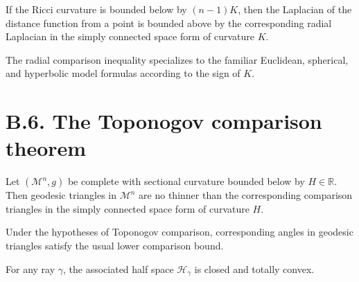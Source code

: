 \begin{theorem}
\label{appb-thm-laplacian-comparison}
If the Ricci curvature is bounded below by $(n-1)K$, then the Laplacian of the distance function from a point is bounded above by the corresponding radial Laplacian in the simply connected space form of curvature $K$.
\end{theorem}

\begin{corollary}
\label{appb-cor-model-space-radial-comparison}
The radial comparison inequality specializes to the familiar Euclidean, spherical, and hyperbolic model formulas according to the sign of $K$.
\end{corollary}

\section*{B.6. The Toponogov comparison theorem}

\begin{theorem}
\label{appb-thm-toponogov-comparison}
Let $(\mathcal M^n,g)$ be complete with sectional curvature bounded below by $H\in\mathbb R$. Then geodesic triangles in $\mathcal M^n$ are no thinner than the corresponding comparison triangles in the simply connected space form of curvature $H$.
\end{theorem}

\begin{corollary}
\label{appb-cor-angle-comparison}
Under the hypotheses of Toponogov comparison, corresponding angles in geodesic triangles satisfy the usual lower comparison bound.
\end{corollary}

\begin{lemma}
\label{appb-lem-halfspace-totally-convex}
For any ray $\gamma$, the associated half space $\mathcal H_\gamma$ is closed and totally convex.
\end{lemma}


